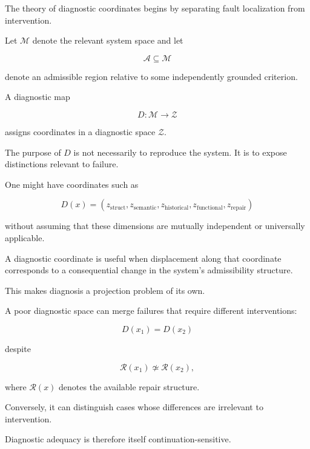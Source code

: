 \documentclass[11pt]{article}
\theoremstyle{remark}
\begin{document}
The theory of diagnostic coordinates begins by separating fault localization from intervention.

Let $\mathcal{M}$ denote the relevant system space and let

\begin{equation}
\mathcal{A}\subseteq\mathcal{M}
\end{equation}

denote an admissible region relative to some independently grounded criterion.

A diagnostic map

\begin{equation}
D:\mathcal{M}\rightarrow\mathcal{Z}
\end{equation}

assigns coordinates in a diagnostic space $\mathcal{Z}$.

The purpose of $D$ is not necessarily to reproduce the system. It is to expose distinctions relevant to failure.

One might have coordinates such as

\begin{equation}
D(x)
=
(z_{\mathrm{struct}},
z_{\mathrm{semantic}},
z_{\mathrm{historical}},
z_{\mathrm{functional}},
z_{\mathrm{repair}})
\end{equation}

without assuming that these dimensions are mutually independent or universally applicable.

A diagnostic coordinate is useful when displacement along that coordinate corresponds to a consequential change in the system's admissibility structure.

This makes diagnosis a projection problem of its own.

A poor diagnostic space can merge failures that require different interventions:

\begin{equation}
D(x_1)=D(x_2)
\end{equation}

despite

\begin{equation}
\mathcal{R}(x_1)\not\simeq\mathcal{R}(x_2),
\end{equation}

where $\mathcal{R}(x)$ denotes the available repair structure.

Conversely, it can distinguish cases whose differences are irrelevant to intervention.

Diagnostic adequacy is therefore itself continuation-sensitive.
\end{document}
